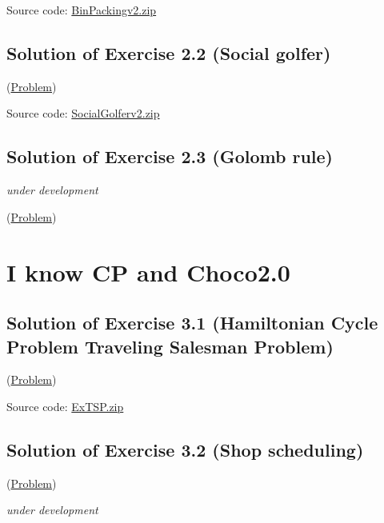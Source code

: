 Source code: \href{media/zip/binpackingv2.zip}{BinPackingv2.zip}

\subsection{Solution of Exercise 2.2 (Social golfer)}\label{solutions:solutionofexercise2.2}\hypertarget{solutions:solutionofexercise2.2}{}
(\hyperlink{exercises:exercise2.2}{Problem})

Source code: \href{media/zip/socialgolferv2.zip}{SocialGolferv2.zip}

\subsection{Solution of Exercise 2.3 (Golomb rule)}\label{solutions:solutionofexercise2.3}\hypertarget{solutions:solutionofexercise2.3}{}

\emph{under development}

(\hyperlink{exercises:exercise2.3}{Problem})

\section{I know CP and Choco2.0}\label{solutions:iknowcpandchoco2.0}\hypertarget{solutions:iknowcpandchoco2.0}{}

\subsection{Solution of Exercise 3.1 (Hamiltonian Cycle Problem Traveling Salesman Problem)}\label{solutions:solutionofexercise3.1}\hypertarget{solutions:solutionofexercise3.1}{}

(\hyperlink{exercises:exercise3.1}{Problem})

Source code: \href{media/zip/extsp.zip}{ExTSP.zip}

\subsection{Solution of Exercise 3.2 (Shop scheduling)}\label{solutions:solutionofexercise3.2}\hypertarget{solutions:solutionofexercise3.2}{}

(\hyperlink{exercises:exercise3.2}{Problem})

\emph{under development}
